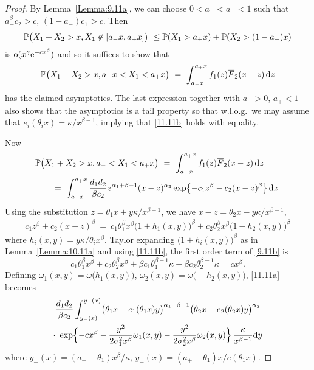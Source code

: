 \begin{proof}
By Lemma~\ref{Lemma:9.11a}, we can choose $0<a_-<a_+<1$ such that $a_+^\beta c_2>c$, $(1-a_-) c_1>c$.
Then
\[\mathbb{P}\bigl (X_1+X_2>x,X_1\not \in [a_-x,a_+x]\bigr)\ \le \mathbb{P}(X_1>a_+x)+ 
\mathbb{P}(X_2>(1-a_-)x)
\]
is ${\mathrm{o}}(x^{\gamma}\mathrm{e}^{-cx^\beta})$ and so it suffices to show that
\begin{equation}\label{9.11a}\mathbb{P}\bigl (X_1+X_2>x, a_-x<X_1<a_+x\bigr)
\ =\ \int_{a_-x}^{a_+x} f_1(z)\overline F_2(x-z)\,\mathrm{d} z\end{equation}
has the claimed asymptotics. The last expression together with $a_->0$, $a_+<1$ also
shows that the asymptotics is a tail property so that w.l.o.g.\ we may assume that
$e_i(\theta_i x)=\kappa/x^{\beta-1}$,  implying  that \eqref{11.11b} holds with equality.

Now
\begin{align}\nonumber \MoveEqLeft  \Prob\bigl (X_1+X_2>x, a_-<X_1<a_+x\bigr)\ =\
\int_{a_-x}^{a_+x} f_1(z)\Fb_2(x-z)\,\dd z\\ \label{11.11a} &= \ \int_{a_-x}^{a_+x} \frac{d_1d_2}{\beta c_2}
z^{\alpha_1+\beta-1}(x-z)^{\alpha_2}
\exp\bigl\{-c_1z^\beta-c_2(x-z)^\beta\bigr\}\,\dd z.
\end{align}
Using the substitution $z=\theta_1x+y\kappa/x^{\beta-1}$, we have $x-z= \theta_2x-y\kappa/x^{\beta-1}$,
\begin{align}\label{9.11b}
c_1z^\beta+c_2(x-z)^\beta \ =\ c_1\theta_1^\beta x^\beta
\bigl(1+h_1(x,y)\bigl)^\beta+c_2\theta_2^\beta x^\beta
\bigl(1-h_2(x,y)\bigl)^\beta
\end{align}
where $h_i(x,y)=y\kappa/\theta_ix^\beta$.
Taylor expanding  $\bigl(1\pm h_i(x,y)\bigl)^\beta$ as in Lemma~\ref{Lemma:10.11a}
and using \eqref{11.11b}, the first order term of \eqref{9.11b} is
\[ c_1\theta_1^\beta x^\beta +c_2\theta_2^\beta x^\beta + \beta c_1\theta_1^{\beta-1}\kappa - \beta c_2\theta_2^{\beta-1}\kappa =c x^\beta. \]
Defining
$\omega_1(x,y)=\omega\bigl(h_1(x,y)\bigr)$, $\omega_2(x,y)=\omega\bigl(-h_2(x,y)\bigr)$, \eqref{11.11a} becomes
 \begin{multline}\nonumber
\frac{d_1d_2}{\beta c_2} \int_{y_-(x)}^{y_+(x)}
\bigl(\theta_1x+e_1(\theta_1x)y\bigr)^{\alpha_1+\beta-1}\bigl(\theta_2x-e_2(\theta_2x)y\bigr)^{\alpha_2}
\\ \cdot\ \exp\Bigl\{-cx^\beta
-\frac{y^2}{2\sigma_1^2x^\beta}\omega_1(x,y)-\frac{y^2}{2\sigma_2^2x^\beta}\omega_2(x,y)
\Bigr\}\,\frac{\kappa}{x^{\beta-1}}\mathrm{d} y
\end{multline}
where $y_-(x)=(a_--\theta_1)x^\beta/\kappa$, $y_+(x)=(a_+-\theta_1)x/e(\theta_1 x)$.

\end{proof}
